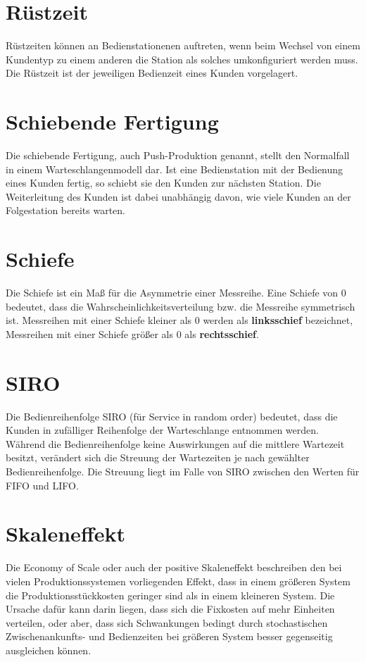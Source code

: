 \section*{Rüstzeit}


Rüstzeiten können an Bedienstationenen auftreten, wenn beim Wechsel
von einem Kundentyp zu einem anderen die Station als solches umkonfiguriert werden muss. Die Rüstzeit ist
der jeweiligen Bedienzeit eines Kunden vorgelagert.

\section*{Schiebende Fertigung}


Die schiebende Fertigung, auch Push-Produktion genannt, stellt den Normalfall in einem Warteschlangenmodell dar.
Ist eine Bedienstation mit der Bedienung eines Kunden fertig, so schiebt sie den Kunden zur nächsten Station.
Die Weiterleitung des Kunden ist dabei unabhängig davon, wie viele Kunden an der Folgestation bereits warten.

\section*{Schiefe}


Die Schiefe ist ein Maß für die Asymmetrie einer Messreihe.
Eine Schiefe von 0 bedeutet, dass die Wahrscheinlichkeitsverteilung bzw. die Messreihe symmetrisch ist.
Messreihen mit einer Schiefe kleiner als 0 werden als \textbf{linksschief} bezeichnet,
Messreihen mit einer Schiefe größer als 0 als \textbf{rechtsschief}.

\section*{SIRO}


Die Bedienreihenfolge SIRO (für Service in random order) bedeutet, dass die Kunden in zufälliger Reihenfolge
der Warteschlange entnommen werden. Während die Bedienreihenfolge keine Auswirkungen auf die mittlere Wartezeit besitzt,
verändert sich die Streuung der Wartezeiten je nach gewählter Bedienreihenfolge. Die Streuung liegt im Falle von SIRO
zwischen den Werten für FIFO und LIFO.

\section*{Skaleneffekt}


Die Economy of Scale oder auch der positive Skaleneffekt beschreiben den bei vielen Produktionssystemen
vorliegenden Effekt, dass in einem größeren System die Produktionsstückkosten geringer sind als in
einem kleineren System. Die Ursache dafür kann darin liegen, dass sich die Fixkosten auf mehr Einheiten
verteilen, oder aber, dass sich Schwankungen bedingt durch stochastischen Zwischenankunfts- und Bedienzeiten
bei größeren System besser gegenseitig ausgleichen können.


